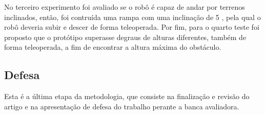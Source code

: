 \documentclass[../main.tex]{subfiles}
\begin{document}
  No terceiro experimento foi avaliado se o robô é capaz de andar por terrenos inclinados, então, foi contruída uma rampa com uma inclinação de 5 \degree, pela qual o robô deveria subir e descer de forma teleoperada. Por fim, para o quarto teste foi proposto que o protótipo superasse degraus de alturas diferentes, também de forma teleoperada, a fim de encontrar a altura máxima do obstáculo.

  \subsection{Defesa}
  Esta é a última etapa da metodologia, que consiste na finalização e revisão do artigo e na apresentação de defesa do trabalho perante a banca avaliadora. 
\end{document}
